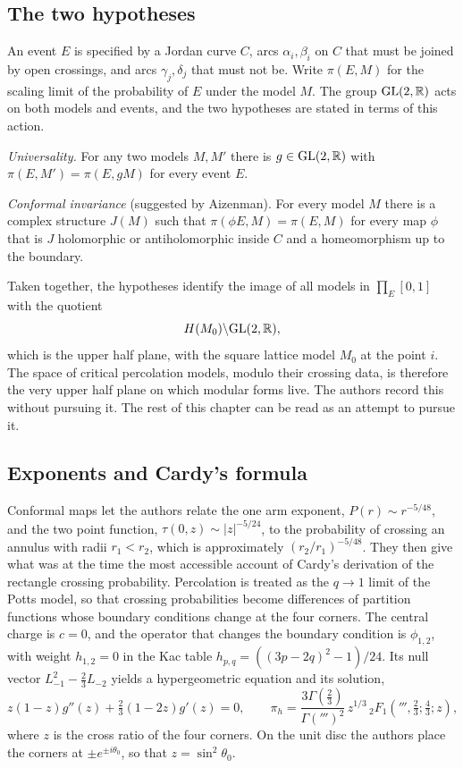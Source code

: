 \subsection{The two hypotheses}

An event $E$ is specified by a Jordan curve $C$, arcs $\alpha_i,\beta_i$ on $C$ that must be joined by open crossings, and arcs $\gamma_j,\delta_j$ that must not be. Write $\pi(E,M)$ for the scaling limit of the probability of $E$ under the model $M$. The group $\mathrm{GL}(2,\mathbb{R})$ acts on both models and events, and the two hypotheses are stated in terms of this action.

\emph{Universality.} For any two models $M,M'$ there is $g\in\mathrm{GL}(2,\mathbb{R})$ with $\pi(E,M') = \pi(E,gM)$ for every event $E$.

\emph{Conformal invariance} (suggested by Aizenman). For every model $M$ there is a complex structure $J(M)$ such that $\pi(\phi E,M) = \pi(E,M)$ for every map $\phi$ that is $J$ holomorphic or antiholomorphic inside $C$ and a homeomorphism up to the boundary.

Taken together, the hypotheses identify the image of all models in $\prod_E[0,1]$ with the quotient
\[
H(M_0)\backslash\mathrm{GL}(2,\mathbb{R}),
\]
which is the upper half plane, with the square lattice model $M_0$ at the point $i$. The space of critical percolation models, modulo their crossing data, is therefore the very upper half plane on which modular forms live. The authors record this without pursuing it. The rest of this chapter can be read as an attempt to pursue it.

\subsection{Exponents and Cardy's formula}

Conformal maps let the authors relate the one arm exponent, $P(r)\sim r^{-5/48}$, and the two point function, $\tau(0,z)\sim|z|^{-5/24}$, to the probability of crossing an annulus with radii $r_1<r_2$, which is approximately $(r_2/r_1)^{-5/48}$. They then give what was at the time the most accessible account of Cardy's derivation \cite{cardy1992} of the rectangle crossing probability. Percolation is treated as the $q\to1$ limit of the Potts model, so that crossing probabilities become differences of partition functions whose boundary conditions change at the four corners. The central charge is $c=0$, and the operator that changes the boundary condition is $\phi_{1,2}$, with weight $h_{1,2}=0$ in the Kac table $h_{p,q} = ((3p-2q)^2-1)/24$. Its null vector $L_{-1}^2-\tfrac23L_{-2}$ yields a hypergeometric equation and its solution,
\[
z(1-z)g''(z)+\tfrac23(1-2z)g'(z) = 0,
\qquad
\pi_h = \frac{3\Gamma(\tfrac23)}{\Gamma(\third)^2}\,z^{1/3}\,{}_2F_1\!\left(\third,\tfrac23;\tfrac43;z\right),
\]
where $z$ is the cross ratio of the four corners. On the unit disc the authors place the corners at $\pm e^{\pm i\theta_0}$, so that $z = \sin^2\theta_0$.

